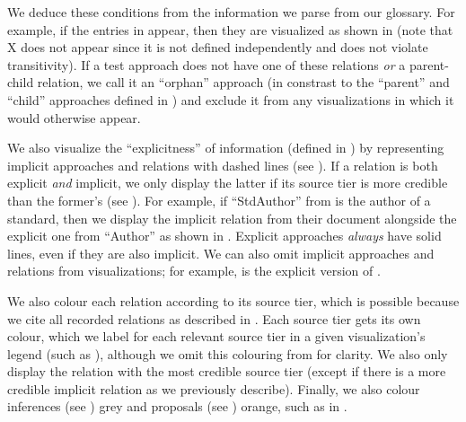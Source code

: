 \ifnotpaper
    \noindent{}\label{syn-conds}%
    We deduce these conditions from the information we parse from our glossary.
    For example, if the entries in  appear, then
    they are visualized as shown in  (note that X
    does not appear since it is not defined independently and does not violate
    transitivity). If a test approach does not have one of these relations
    \emph{or} a parent-child relation, we call it an ``orphan'' approach
    (in constrast to the ``parent'' and ``child'' approaches defined in
    ) and exclude it from any visualizations in which it
    would otherwise appear.

    
    \ExampleSynGraph{}

    \label{visExplicit}
    We also visualize the ``explicitness'' of information (defined in
    ) by representing implicit approaches and relations
    with dashed lines (see ).
    If a relation is both explicit \emph{and} implicit, we only display the
    latter if its source tier is more credible than the former's (see
    ). For example, if
    ``StdAuthor'' from  is the author of a
    standard, then we display the implicit relation from their
    document alongside the explicit one from ``Author'' as shown in
    .
    Explicit approaches
    \emph{always} have solid lines, even if they are also implicit. We
    can also omit implicit approaches and relations from visualizations; for
    example,  is the explicit version of
    . %

    \clearpage
    We also colour each relation according to its source tier, which is
    possible because we cite all recorded relations as described in
    . Each source tier gets its own colour, which we label
    for each relevant source tier in a given visualization's legend
    (such as ), although we omit this
    colouring from  for
    clarity. We also only display the relation with the most credible source
    tier (except if there is a more credible implicit relation as we previously
    describe). Finally, we also colour inferences (see ) grey and
    proposals (see ) orange, such as in \recFigs{}.

